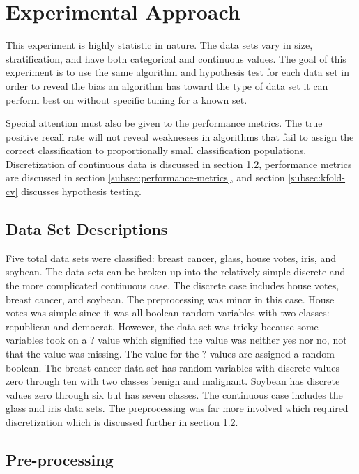 \section{Experimental Approach} \label{sec:exp-approach}
This experiment is highly statistic in nature.
The data sets vary in size, stratification, and have both categorical and continuous values.
The goal of this experiment is to use the same algorithm and hypothesis test for each data set in order to reveal the bias an algorithm has toward the type of data set it can perform best on without specific tuning for a known set.

Special attention must also be given to the performance metrics.
The true positive recall rate will not reveal weaknesses in algorithms that fail to assign the correct classification to proportionally small classification populations.
Discretization of continuous data is discussed in section \ref{subsec:pre-processing}, performance metrics are discussed in section \ref{subsec:performance-metrics}, and section \ref{subsec:kfold-cv}  discusses hypothesis testing. 

\subsection{Data Set Descriptions} \label{subsec:dataset-desc}
Five total data sets \cite{Lichman} were classified: breast cancer, glass, house votes, iris, and soybean. 
The data sets can be broken up into the relatively simple discrete and the more complicated continuous case. 
The discrete case includes house votes, breast cancer, and soybean. 
The preprocessing was minor in this case. 
House votes was simple since it was all boolean random variables with two classes: republican and democrat. 
However, the data set was tricky because some variables took on a ? value which signified the value was neither yes nor no, not that the value was missing. 
The value for the ? values are assigned a random boolean. 
The breast cancer data set has random variables with discrete values zero through ten with two classes benign and malignant. 
Soybean has discrete values zero through six but has seven classes. 
The continuous case includes the glass and iris data sets. 
The preprocessing was far more involved which required discretization which is discussed further in section \ref{subsec:pre-processing}.

\subsection{Pre-processing} \label{subsec:pre-processing}
